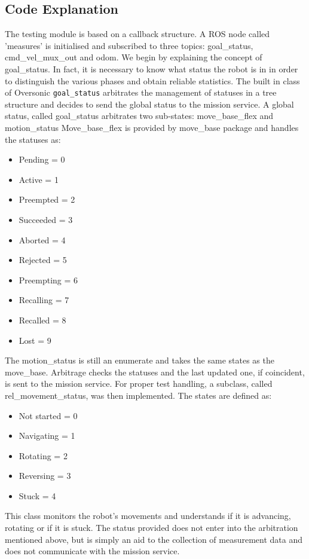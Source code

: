 \subsection{Code Explanation}
The testing module is based on a callback structure. A ROS node called 'measures' is initialised and subscribed to three topics: goal\_status, cmd\_vel\_mux\_out and odom. 
We begin by explaining the concept of goal\_status. In fact, it is necessary to know what status the robot is in in order to distinguish the various phases and obtain reliable statistics. 
The built in class of Oversonic \texttt{goal\_status} arbitrates the management of statuses in a tree structure and decides to send the global status to the mission service. A global status, called goal\_status arbitrates two sub-states: move\_base\_flex and motion\_status 
Move\_base\_flex is provided by move\_base package and handles the statuses as:
\begin{itemize}
    \item Pending         = 0
    \item Active          = 1
    \item Preempted      = 2
    \item Succeeded       = 3
    \item Aborted         = 4
    \item Rejected        = 5
    \item Preempting      = 6
    \item Recalling       = 7
    \item Recalled        = 8
    \item Lost            = 9
\end{itemize}
The motion\_status is still an enumerate and takes the same states as the move\_base. Arbitrage checks the statuses and the last updated one, if coincident, is sent to the mission service. 
For proper test handling, a subclass, called rel\_movement\_status, was then implemented. 
The states are defined as: 
\begin{itemize}
    \item Not started = 0
    \item Navigating = 1
    \item Rotating = 2
    \item Reversing = 3
    \item Stuck = 4
\end{itemize}
This class monitors the robot's movements and understands if it is advancing, rotating or if it is stuck. The status provided does not enter into the arbitration mentioned above, but is simply an aid to the collection of measurement data and does not communicate with the mission service.

